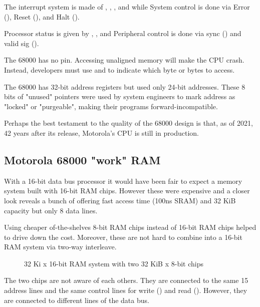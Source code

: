 The interrupt system is made of , , , and  while System control is done via Error (), Reset (), and Halt ().

Processor status is given by , ,  and Peripheral control is done via sync () and valid sig ().


\begin{trivia}
 The 68000 has no  pin. Accessing unaligned memory will make the CPU crash. Instead, developers must use  and  to indicate which byte or bytes to access.
\end{trivia}

\begin{trivia}
 The 68000 has 32-bit address registers but used only 24-bit addresses. These 8 bits of "unused" pointers were used by system engineers to mark address as "locked" or "purgeable", making their programs forward-incompatible. 
\end{trivia}

Perhaps the best testament to the quality of the 68000 design is that, as of 2021, 42 years after its release, Motorola's CPU is still in production.


\subsection{Motorola 68000 "work" RAM}
With a 16-bit data bus processor it would have been fair to expect a memory system built with 16-bit RAM chips. However these were expensive and a closer look reveals a bunch of  offering fast access time (100ns SRAM) and 32 KiB capacity but only 8 data lines.

\pagebreak

Using cheaper of-the-shelves 8-bit RAM chips instead of 16-bit RAM chips helped to drive down the cost. Moreover, these are not hard to combine into a 16-bit RAM system via two-way interleave.

\begin{figure}[H]
\caption*{32 Ki x 16-bit RAM system with two 32 KiB x 8-bit chips}
\end{figure}

The two chips are not aware of each others. They are connected to the same 15 address lines and the same control lines for write () and read (). However, they are connected to different lines of the data bus. 

